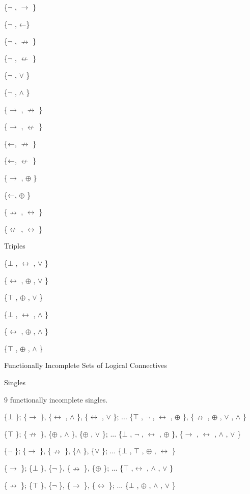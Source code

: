 \{$\neg$ , $\to$ \}

\{$\neg$ , ←\}

\{$\neg$ , $\nrightarrow$ \}

\{$\neg$ , $\nleftarrow$ \}

\{$\neg$ , $\lor$ \}

\{$\neg$ , $\land$ \}

\{$\to$ , $\nrightarrow$ \}

\{$\to$ , $\nleftarrow$ \}

\{←, $\nrightarrow$ \}

\{←, $\nleftarrow$ \}

\{$\to$ , $\oplus$ \}

\{←, $\oplus$ \}

\{$\nrightarrow$ , $\leftrightarrow$ \}

\{$\nleftarrow$ , $\leftrightarrow$ \}

\protect\hypertarget{anchor-5}{}{}Triples

\{$\bot$ , $\leftrightarrow$ , $\lor$ \}

\{$\leftrightarrow$ , $\oplus$ , $\lor$ \}

\{$\top$ , $\oplus$ , $\lor$ \}

\{$\bot$ , $\leftrightarrow$ , $\land$ \}

\{$\leftrightarrow$ , $\oplus$ , $\land$ \}

\{$\top$ , $\oplus$ , $\land$ \}

\protect\hypertarget{anchor-6}{}{}Functionally Incomplete Sets of
Logical Connectives

\protect\hypertarget{anchor-7}{}{}Singles

9 functionally incomplete singles.

\{$\bot$ \}; \{$\to$ \}, \{$\leftrightarrow$ , $\land$ \}, \{$\leftrightarrow$ , $\lor$ \}; ... \{$\top$ , $\neg$ , $\leftrightarrow$ , $\oplus$ \}, \{$\nrightarrow$ , $\oplus$ , $\lor$ , $\land$ \}

\{$\top$ \}; \{$\nrightarrow$ \}, \{$\oplus$ , $\land$ \}, \{$\oplus$ , $\lor$ \}; ... \{$\bot$ , $\neg$ , $\leftrightarrow$ , $\oplus$ \}, \{$\to$ , $\leftrightarrow$ , $\land$ , $\lor$ \}

\{$\neg$ \}; \{$\to$ \}, \{$\nrightarrow$ \}, \{$\land$ \}, \{$\lor$ \}; ... \{$\bot$ , $\top$ , $\oplus$ , $\leftrightarrow$ \}

\{$\to$ \}; \{$\bot$ \}, \{$\neg$ \}, \{$\nrightarrow$ \}, \{$\oplus$ \}; ... \{$\top$ ,$\leftrightarrow$ , $\land$ , $\lor$ \}

\{$\nrightarrow$ \}; \{$\top$ \}, \{$\neg$ \}, \{$\to$ \}, \{$\leftrightarrow$ \}; ... \{$\bot$ , $\oplus$ , $\land$ , $\lor$ \}

